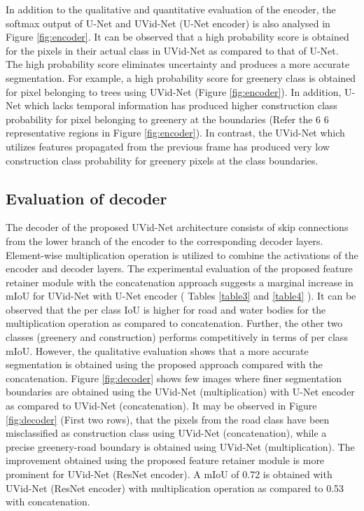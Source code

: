 \documentclass[journal]{IEEEtran}
\begin{document}
In addition to the qualitative and quantitative evaluation of the encoder, the softmax output of U-Net and UVid-Net (U-Net encoder) is also analysed in Figure \ref{fig:encoder}. It can be observed that a high probability score is obtained for the pixels in their actual class in UVid-Net as compared to that of U-Net. The high probability score eliminates uncertainty and produces a more accurate segmentation. For example, a high probability score for greenery class is obtained for pixel belonging to trees using UVid-Net (Figure \ref{fig:encoder}). In addition, U-Net which lacks temporal information has produced higher construction class probability for pixel belonging to greenery at the boundaries (Refer the 6  6 representative regions in Figure \ref{fig:encoder}). In contrast, the UVid-Net which utilizes features propagated from the previous frame has produced very low construction class probability for greenery pixels at the class boundaries. 







\subsection{Evaluation of decoder}
\label{Sec:Decoder}
The decoder of the proposed UVid-Net architecture consists of skip connections from the lower branch of the encoder to the corresponding decoder layers. Element-wise multiplication operation is utilized to combine the activations of the encoder and decoder layers. The experimental evaluation of the proposed feature retainer module with the concatenation approach suggests a marginal increase in mIoU for UVid-Net with U-Net encoder ( Tables \ref{table3} and \ref{table4} ).  It can be observed that the per class IoU is higher for road and water bodies for the multiplication operation as compared to concatenation. Further, the other two classes (greenery and construction) performs competitively in terms of per class mIoU. However, the qualitative evaluation shows that a more accurate segmentation is obtained using the proposed approach compared with the concatenation. Figure \ref{fig:decoder} shows few images where finer segmentation boundaries are obtained using the UVid-Net (multiplication) with U-Net encoder as compared to UVid-Net (concatenation). It may be observed in Figure \ref{fig:decoder} (First two rows), that the pixels from the road class have been misclassified as construction class using UVid-Net (concatenation), while a precise greenery-road boundary is obtained using UVid-Net (multiplication).  The improvement obtained using the proposed feature retainer module is more prominent for UVid-Net (ResNet encoder).  A mIoU of 0.72 is obtained with UVid-Net (ResNet encoder) with multiplication operation as compared to 0.53 with concatenation. 
\end{document}
